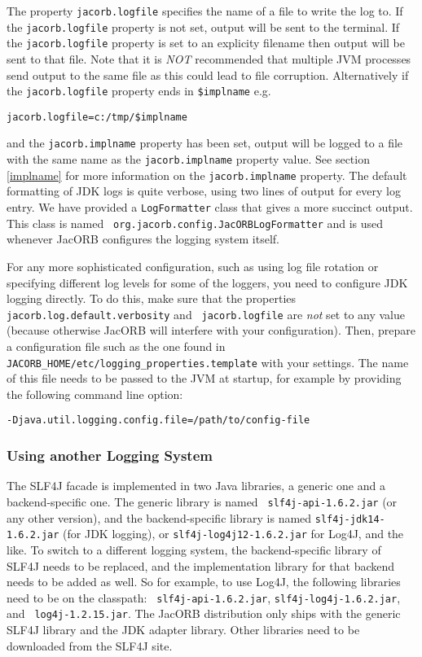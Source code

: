 The property {\tt jacorb.logfile} specifies the name of a file to
write the log to.  If the {\tt jacorb.logfile} property is not set, output
will be sent to the terminal.
If the {\tt jacorb.logfile} property is set to an explicity filename then
output will be sent to that file. Note that it is \emph{NOT} recommended that
multiple JVM processes send output to the same file as this could lead to file
corruption. Alternatively if the {\tt jacorb.logfile} property ends in
{\tt \$implname} e.g.
\small{
\begin{verbatim}
jacorb.logfile=c:/tmp/$implname
\end{verbatim}
}
\small\normalsize
and the {\tt jacorb.implname} property has been set, output will be logged
to a file with the same name as the {\tt jacorb.implname} property value. See
section \ref{implname} for more information on the {\tt jacorb.implname} property.
The default formatting of JDK logs is quite verbose, using two lines
of output for every log entry.  We have provided a {\tt LogFormatter}
class that gives a more succinct output.  This class is named {\tt
  org.jacorb.config.JacORBLogFormatter} and is used whenever JacORB
configures the logging system itself.

For any more sophisticated configuration, such as using log file
rotation or specifying different log levels for some of the loggers,
you need to configure JDK logging directly.  To do this, make sure
that the properties {\tt jacorb.log.default.verbosity} and {\tt
  jacorb.logfile} are \emph{not} set to any value (because otherwise
JacORB will interfere with your configuration).  Then, prepare a
configuration file such as the one found in {\tt
  JACORB\_HOME/etc/logging\_properties.template} with your settings.
The name of this file needs to be passed to the JVM at startup, for
example by providing the following command line option:

\begin{verbatim}
-Djava.util.logging.config.file=/path/to/config-file
\end{verbatim}

\subsubsection{Using another Logging System}

The SLF4J facade is implemented in two Java libraries, a generic one
and a backend-specific one.  The generic library is named {\tt
  slf4j-api-1.6.2.jar} (or any other version), and the
backend-specific library is named {\tt slf4j-jdk14-1.6.2.jar} (for JDK
logging), or {\tt slf4j-log4j12-1.6.2.jar} for Log4J, and the like.  To
switch to a different logging system, the backend-specific library of
SLF4J needs to be replaced, and the implementation library for that
backend needs to be added as well.  So for example, to use Log4J, the
following libraries need to be on the classpath: {\tt
  slf4j-api-1.6.2.jar}, {\tt slf4j-log4j-1.6.2.jar}, and {\tt
  log4j-1.2.15.jar}.  The JacORB distribution only ships with the
generic SLF4J library and the JDK adapter library.  Other libraries
need to be downloaded from the SLF4J site.

